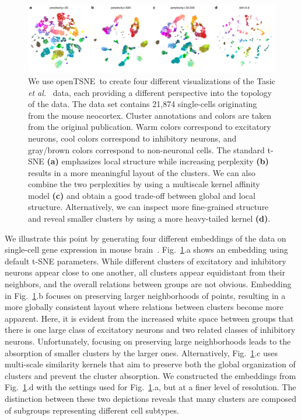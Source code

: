 \documentclass[twocolumn]{bmcart}
\newcommand{\opentsne}{\textsf{openTSNE}}
\begin{document}
\begin{figure}[htbp]
	\includegraphics[width=\textwidth]{tasic2018}
	\caption{\label{fig:tasic}We use \opentsne\ to create four different
    visualizations of the Tasic \textit{et al.}~\cite{tasic2018shared} data,
    each providing a different perspective into the topology of the data.
    The data set contains 21,874 single-cells originating from the mouse
	neocortex. Cluster annotations and colors are taken from the original
	publication. Warm colors correspond to excitatory neurons, cool colors
	correspond to inhibitory neurons, and gray/brown colors correspond to
	non-neuronal cells. The standard t-SNE \textbf{(a)} emphasizes local
	structure while increasing perplexity \textbf{(b)} results in a more
	meaningful layout of the clusters. We can also combine the two
	perplexities by using a multiscale kernel affinity model \textbf{(c)}
	and obtain a good trade-off between global and local structure.
	Alternatively, we can inspect more fine-grained structure and reveal
	smaller clusters by using a more heavy-tailed kernel \textbf{(d)}.}
\end{figure}

We illustrate this point by generating four different embeddings of the data on single-cell gene expression in mouse brain~\cite{tasic2018shared}.  Fig.~\ref{fig:tasic}.a shows an embedding using default t-SNE parameters. While different clusters of excitatory and inhibitory neurons appear close to one another, all clusters appear equidistant from their neighbors, and the overall relations between groups are not obvious. Embedding in Fig.~\ref{fig:tasic}.b focuses on preserving larger neighborhoods of points, resulting in a more globally consistent layout where relations between clusters become more apparent. Here, it is evident from the increased white space between groups that there is one large class of excitatory neurons and two related classes of inhibitory neurons. Unfortunately, focusing on preserving large neighborhoods leads to the absorption of smaller clusters by the larger ones. Alternatively, Fig.~\ref{fig:tasic}.c uses multi-scale similarity kernels that aim to preserve both the global organization of clusters and prevent the cluster absorption. We constructed the embeddings from Fig.~\ref{fig:tasic}.d with the settings used for Fig.~\ref{fig:tasic}.a, but at a finer level of resolution. The distinction between these two depictions reveals that many clusters are composed of subgroups representing different cell subtypes.
\end{document}
